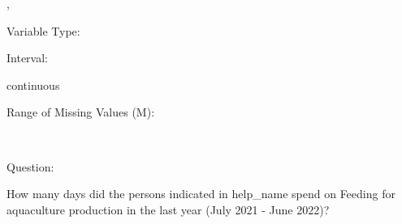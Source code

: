 \documentclass[
]{article}
\begin{document}
,

\begin{minipage}[t]{0.3\linewidth}

\colorbox{mypink1}{}

\end{minipage}%
\begin{minipage}[t]{0.7\linewidth}

\colorbox{mypink1}{\makebox[\textwidth]{\strut\bfseries\color{black}  
 }}

\end{minipage}

\begin{minipage}[t]{0.3\linewidth}

Variable Type:

\end{minipage}%
\begin{minipage}[t]{0.7\linewidth}

\end{minipage}

\begin{minipage}[t]{0.3\linewidth}

Interval:

\end{minipage}%
\begin{minipage}[t]{0.7\linewidth}

continuous

\end{minipage}

\begin{minipage}[t]{0.3\linewidth}

Range of Missing Values (M):

\end{minipage}%
\begin{minipage}[t]{0.7\linewidth}

~

\end{minipage}

\begin{minipage}[t]{0.3\linewidth}

Question:

\end{minipage}%
\begin{minipage}[t]{0.7\linewidth}

How many days did the persons indicated in help\_name spend on Feeding
for aquaculture production in the last year (July 2021 - June 2022)?

\end{minipage}
\end{document}

